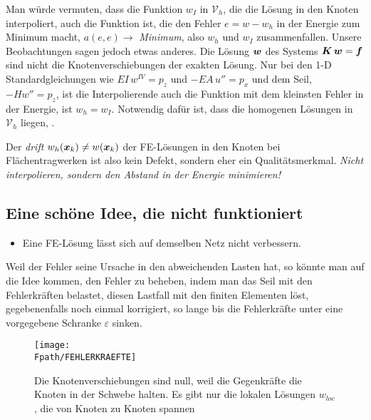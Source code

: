 \begin{remark}
Man w\"{u}rde vermuten, dass die Funktion $w_I$ in $\mathcal{V}_h$, die die L\"{o}sung in den Knoten interpoliert, auch die Funktion ist, die den Fehler $e = w - w_h$ in der Energie zum Minimum macht, $a(e,e) \to$ {\em  Minimum\/}, also $w_h$ und $w_I$ zusammenfallen. Unsere Beobachtungen sagen jedoch etwas anderes. Die L\"{o}sung $\mbox{\boldmath $w$}$ des Systems $\mbox{\boldmath $K$}\,\mbox{\boldmath $w$} = \mbox{\boldmath $f$}$ sind nicht die Knotenverschiebungen der exakten L\"{o}sung. Nur bei den 1-D Standardgleichungen wie $EI\,w^{IV} = p_z$ und $- EA\,u'' = p_x$ und dem Seil, $- H w'' = p_z$, ist die Interpolierende auch die Funktion mit dem kleinsten Fehler in der Energie, ist $w_h = w_I$. Notwendig daf\"{u}r ist, dass die homogenen L\"{o}sungen in $\mathcal{V}_h$ liegen, \cite{HaJa2}.

Der {\em drift\/} $w_h(\mbox{\boldmath $x$}_k) \neq w(\mbox{\boldmath $x$}_k)$ der FE-L\"{o}sungen in den Knoten bei Fl\"{a}chentragwerken ist also kein Defekt, sondern eher ein \glq Qualit\"{a}tsmerkmal\grq{}. {\em Nicht interpolieren, sondern den Abstand in der Energie minimieren!\/}
\end{remark}
\vspace{-0.5cm}
{\textcolor{sectionTitleBlue}{\section{Eine sch\"{o}ne Idee, die nicht funktioniert}}}
\label{Eine schoene Idee, die nicht funktioniert}
\begin{itemize}
\item{Eine FE-L\"{o}sung l\"{a}sst sich auf demselben Netz nicht verbessern.}
\end{itemize}
Weil der Fehler seine Ursache in den abweichenden Lasten hat, so k\"{o}nnte man auf die Idee kommen, den Fehler zu beheben, indem man das Seil mit den Fehlerkr\"{a}ften belastet, diesen Lastfall mit den finiten Elementen l\"{o}st, gegebenenfalls noch einmal korrigiert, so lange bis die Fehlerkr\"{a}fte unter eine vorgegebene Schranke $\varepsilon$ sinken.
\begin{figure}[tbp] \centering
\if {} \sidecaption \fi
\texttt{[image: \\Fpath/FEHLERKRAEFTE]}
\caption{Die Knotenverschiebungen sind null, weil die Gegenkr\"{a}fte die Knoten in der Schwebe halten. Es gibt nur die lokalen L\"{o}sungen $w_{loc}$, die von Knoten zu Knoten spannen} \label{Fehlerkraefte}
\end{figure}%

